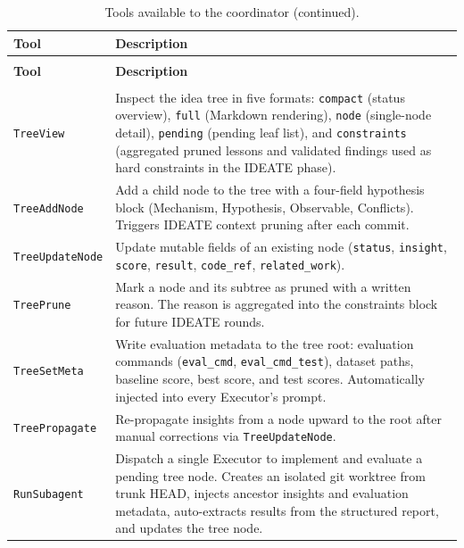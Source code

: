 \documentclass{llmxive}
\providecommand{\arraystretch}{1.08}
\begin{document}
\begingroup
\footnotesize
\setlength{\tabcolsep}{3pt}
\renewcommand{\arraystretch}{1.02}
\setlength{\LTpre}{4pt}
\setlength{\LTpost}{6pt}
\begin{xltabular}{\linewidth}{>{\arraybackslash}p{3.8cm}>{\arraybackslash}X}
\caption{Tools available to the coordinator.}
\label{tab:meta-agent-tools}\\
\toprule
\textbf{Tool} & \textbf{Description} \\
\midrule
\endfirsthead
\caption[]{Tools available to the coordinator (continued).}\\
\toprule
\textbf{Tool} & \textbf{Description} \\
\midrule
\endhead
\midrule
{}\\
\endfoot
\bottomrule
\endlastfoot
\texttt{TreeView} & Inspect the idea tree in five formats: \texttt{compact} (status overview), \texttt{full} (Markdown rendering), \texttt{node} (single-node detail), \texttt{pending} (pending leaf list), and \texttt{constraints} (aggregated pruned lessons and validated findings used as hard constraints in the IDEATE phase). \\
\texttt{TreeAddNode} & Add a child node to the tree with a four-field hypothesis block (Mechanism, Hypothesis, Observable, Conflicts). Triggers IDEATE context pruning after each commit. \\
\texttt{TreeUpdateNode} & Update mutable fields of an existing node (\texttt{status}, \texttt{insight}, \texttt{score}, \texttt{result}, \texttt{code\_ref}, \texttt{related\_work}). \\
\texttt{TreePrune} & Mark a node and its subtree as pruned with a written reason. The reason is aggregated into the constraints block for future IDEATE rounds. \\
\texttt{TreeSetMeta} & Write evaluation metadata to the tree root: evaluation commands (\texttt{eval\_cmd}, \texttt{eval\_cmd\_test}), dataset paths, baseline score, best score, and test scores. Automatically injected into every Executor's prompt. \\
\texttt{TreePropagate} & Re-propagate insights from a node upward to the root after manual corrections via \texttt{TreeUpdateNode}. \\
\texttt{RunSubagent} & Dispatch a single Executor to implement and evaluate a pending tree node. Creates an isolated git worktree from trunk HEAD, injects ancestor insights and evaluation metadata, auto-extracts results from the structured report, and updates the tree node. \\

\end{xltabular}
\end{document}
